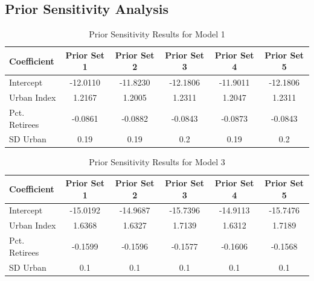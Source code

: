 \documentclass[12pt]{article}
\begin{document}
\clearpage
\FloatBarrier
\subsection*{Prior Sensitivity Analysis}
\begin{table}[h]
    \centering
    \begin{tabular}{l|ccccc}
        \hline
        Coefficient    & Prior Set 1 & Prior Set 2 & Prior Set 3 & Prior Set 4 & Prior Set 5 \\
        \hline
        Intercept      & -12.0110 & -11.8230 & -12.1806 & -11.9011 & -12.1806 \\
        Urban Index    & 1.2167 & 1.2005 & 1.2311 & 1.2047 & 1.2311 \\
        Pct. Retirees  & -0.0861 & -0.0882 & -0.0843 & -0.0873 & -0.0843 \\
        SD Urban       & 0.19    & 0.19    & 0.2     & 0.19    & 0.2     \\
        \hline
        \hline
    \end{tabular}
    \caption{Prior Sensitivity Results for Model 1}
    \label{tab:Prior Sensitivity Results for Model 1}
\end{table}

\begin{table}[h]
    \centering
    \begin{tabular}{l|ccccc}
        \hline
        Coefficient    & Prior Set 1 & Prior Set 2 & Prior Set 3 & Prior Set 4 & Prior Set 5 \\
        \hline
        Intercept      & -15.0192 & -14.9687 & -15.7396 & -14.9113 & -15.7476 \\
        Urban Index    & 1.6368 & 1.6327 & 1.7139 & 1.6312 & 1.7189 \\
        Pct. Retirees  & -0.1599 & -0.1596 & -0.1577 & -0.1606 & -0.1568 \\
        SD Urban       & 0.1    & 0.1    & 0.1     & 0.1    & 0.1     \\
        \hline
    \end{tabular}
    \caption{Prior Sensitivity Results for Model 3}
    \label{tab:Prior Sensitivity Results for Model 3}
\end{table}






\FloatBarrier

\clearpage
\newpage
\printbibliography
\end{document}
